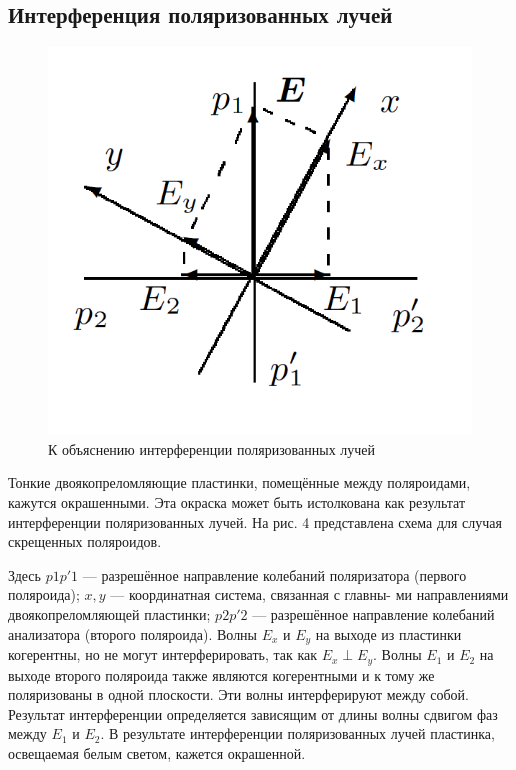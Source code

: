 \documentclass[a4paper, 12pt]{article}%
\begin{document}
\subsection{Интерференция поляризованных лучей}

\begin{figure}
	\includegraphics[width=\linewidth]{images/4.png}
	\caption{К объяснению интерференции
поляризованных лучей}
	\label{ris 4}
\end{figure}


Тонкие двоякопреломляющие пластинки, помещённые между поляроидами, кажутся окрашенными. Эта окраска может быть истолкована как результат интерференции поляризованных лучей. На рис. 4 представлена схема для
случая скрещенных поляроидов.

Здесь $ p1p'1 $ --- разрешённое направление колебаний поляризатора
(первого поляроида); $ x, y $ --- координатная система, связанная с главны-
ми направлениями двоякопреломляющей пластинки; $ p2p'2 $ --- разрешённое направление колебаний анализатора (второго поляроида). Волны
$ E_x  $ и $ E_y $ на выходе из пластинки когерентны, но не могут интерферировать, так как $ E_x \perp  E_y $. Волны $ E_1 $ и $ E_2 $ на выходе второго поляроида
также являются когерентными и к тому же поляризованы в одной плоскости. Эти волны интерферируют между собой. Результат интерференции определяется зависящим от длины волны сдвигом фаз между $ E_1 $
и $ E_2 $. В результате интерференции поляризованных лучей пластинка, освещаемая белым светом, кажется окрашенной.
\end{document}
